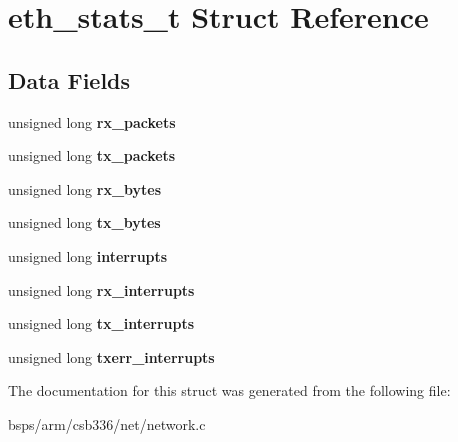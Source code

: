 \hypertarget{structeth__stats__t}{}\section{eth\+\_\+stats\+\_\+t Struct Reference}
\label{structeth__stats__t}
\subsection*{Data Fields}
\begin{DoxyCompactItemize}
\item 
\mbox{\label{structeth__stats__t_ab8bf1dd560d4b66a5ee3a90e5f90e4e4}} 
unsigned long {\bfseries rx\+\_\+packets}
\item 
\mbox{\label{structeth__stats__t_ac08825f7e94e071ee5992514d7ac5cf8}} 
unsigned long {\bfseries tx\+\_\+packets}
\item 
\mbox{\label{structeth__stats__t_a0ba5b063aa3201443b1aba6e5f7a2300}} 
unsigned long {\bfseries rx\+\_\+bytes}
\item 
\mbox{\label{structeth__stats__t_a3e9a99a999933ec81a63e5623eb2be99}} 
unsigned long {\bfseries tx\+\_\+bytes}
\item 
\mbox{\label{structeth__stats__t_a577c1ba683e3e4810f4420c53e63ae95}} 
unsigned long {\bfseries interrupts}
\item 
\mbox{\label{structeth__stats__t_abb18fe9b8ac55dd6ef0440e7c5111d09}} 
unsigned long {\bfseries rx\+\_\+interrupts}
\item 
\mbox{\label{structeth__stats__t_a4664da04da15ebd1453324f8d0b0abb9}} 
unsigned long {\bfseries tx\+\_\+interrupts}
\item 
\mbox{\label{structeth__stats__t_abe80ba8a2c729424da22379c575189fd}} 
unsigned long {\bfseries txerr\+\_\+interrupts}
\end{DoxyCompactItemize}


The documentation for this struct was generated from the following file\+:\begin{DoxyCompactItemize}
\item 
bsps/arm/csb336/net/network.\+c\end{DoxyCompactItemize}
